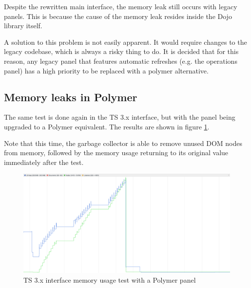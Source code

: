 Despite the rewritten main interface, the memory leak still occurs with legacy
panels. This is because the cause of the memory leak resides inside the Dojo
library itself.

A solution to this problem is not easily apparent. It would require changes to
the legacy codebase, which is always a risky thing to do.
It is decided that for this reason, any legacy panel that features automatic
refreshes (e.g. the operations panel) has a high priority to be replaced with a
polymer alternative.

\subsection{Memory leaks in Polymer}
\label{Memory leaks in Polymer}

The same test is done again in the TS 3.x interface, but with the panel being
upgraded to a Polymer equivalent. The results are shown in figure \ref{fig:ts3_memory}.

Note that this time, the garbage collector is able to remove unused DOM nodes
from memory, followed by the memory usage returning to its original value
immediately after the test.

\begin{figure}
  \centering
  \includegraphics[width=\textwidth]{images/kill-all-humans-120s-run}
  \caption{TS 3.x interface memory usage test with a Polymer panel}
  \label{fig:ts3_memory}
\end{figure}
